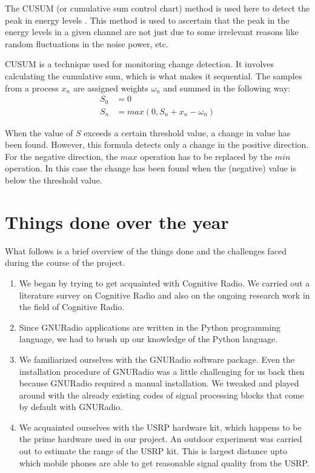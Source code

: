 The CUSUM (or cumulative sum control chart) method is used here to detect 
the peak in energy levels \cite{wikiCUSUM}. This method is used to ascertain 
that the peak in the energy levels in a given channel are not just due to some
irrelevant reasons like random fluctuations in the noise power, etc.
 
CUSUM is a technique used for monitoring change detection. It involves 
calculating the cumulative sum, which is what makes it sequential. The samples
from a process $x_n$ are assigned weights $\omega_n$ and summed in the 
following way:
\begin{align}
    S_0 &= 0 \nonumber \\
    S_n &= max(0, S_n + x_n - \omega_n) \nonumber
\end{align}

When the value of $S$ exceeds a certain threshold value, a change in value has 
been found. However, this formula detects only a change in the positive 
direction. For the negative direction, the $max$ operation has to be replaced 
by the $min$ operation. In this case the change has been found when the 
(negative) value is below the threshold value.


\section{Things done over the year}

What follows is a brief overview of the things done and the challenges faced 
during the course of the project.

\begin{enumerate}
    \item We began by trying to get acquainted with Cognitive Radio. We 
    carried out a literature survey on Cognitive Radio and also on the ongoing 
    research work in the field of Cognitive Radio.
    \item Since GNURadio applications are written in the Python programming 
    language, we had to brush up our knowledge of the Python language.
    \item We familiarized ourselves with the GNURadio software package. Even 
    the installation procedure of GNURadio was a little challenging for us
    back then because GNURadio required a manual installation. We tweaked
    and played around with the already existing codes of signal processing
    blocks that come by default with GNURadio.
    \item We acquainted ourselves with the USRP hardware kit, which happens to
    be the prime hardware used in our project. An outdoor experiment was
    carried out to estimate the range of the USRP kit. This is largest 
    distance upto which mobile phones are able to get reasonable signal
    quality from the USRP.
    
\end{enumerate}



